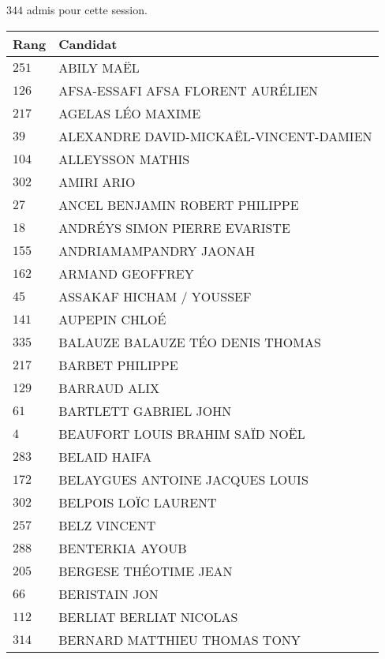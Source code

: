 




  $344$ admis pour cette session.

  \begin{xltabular}{\linewidth}{|l|X|}
    \hline
    \textbf{Rang} & \textbf{Candidat} \\
    \hline
    $251$ & ABILY MAËL \\
    \hline
    $126$ & AFSA-ESSAFI AFSA FLORENT AURÉLIEN \\
    \hline
    $217$ & AGELAS LÉO MAXIME \\
    \hline
    $39$ & ALEXANDRE DAVID-MICKAËL-VINCENT-DAMIEN \\
    \hline
    $104$ & ALLEYSSON MATHIS \\
    \hline
    $302$ & AMIRI ARIO \\
    \hline
    $27$ & ANCEL BENJAMIN ROBERT PHILIPPE \\
    \hline
    $18$ & ANDRÉYS SIMON PIERRE EVARISTE \\
    \hline
    $155$ & ANDRIAMAMPANDRY JAONAH \\
    \hline
    $162$ & ARMAND GEOFFREY \\
    \hline
    $45$ & ASSAKAF HICHAM / YOUSSEF \\
    \hline
    $141$ & AUPEPIN CHLOÉ \\
    \hline
    $335$ & BALAUZE BALAUZE TÉO DENIS THOMAS \\
    \hline
    $217$ & BARBET PHILIPPE \\
    \hline
    $129$ & BARRAUD ALIX \\
    \hline
    $61$ & BARTLETT GABRIEL JOHN \\
    \hline
    $4$ & BEAUFORT LOUIS BRAHIM SAÏD NOËL \\
    \hline
    $283$ & BELAID HAIFA \\
    \hline
    $172$ & BELAYGUES ANTOINE JACQUES LOUIS \\
    \hline
    $302$ & BELPOIS LOÏC LAURENT \\
    \hline
    $257$ & BELZ VINCENT \\
    \hline
    $288$ & BENTERKIA AYOUB \\
    \hline
    $205$ & BERGESE THÉOTIME JEAN \\
    \hline
    $66$ & BERISTAIN JON \\
    \hline
    $112$ & BERLIAT BERLIAT NICOLAS \\
    \hline
    $314$ & BERNARD MATTHIEU THOMAS TONY \\

\end{xltabular}
